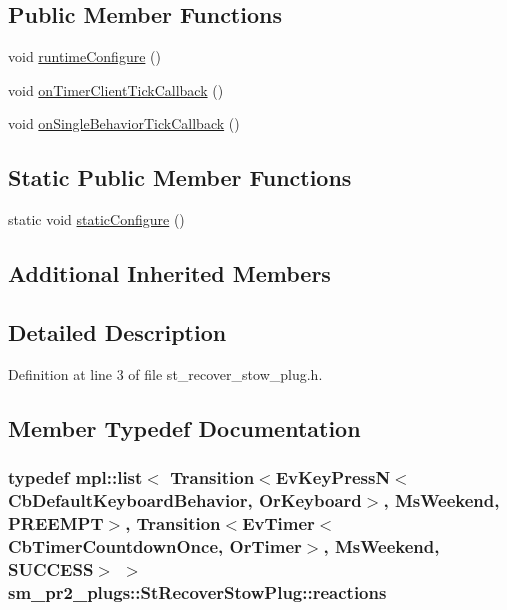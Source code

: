 \subsection*{Public Member Functions}
\begin{DoxyCompactItemize}
\item 
void \hyperlink{structsm__pr2__plugs_1_1StRecoverStowPlug_a5f2f825961ceda59ed4811aaca86bbcf}{runtime\+Configure} ()
\item 
void \hyperlink{structsm__pr2__plugs_1_1StRecoverStowPlug_adda940da8f2073a8bcf5ce4d06baccf2}{on\+Timer\+Client\+Tick\+Callback} ()
\item 
void \hyperlink{structsm__pr2__plugs_1_1StRecoverStowPlug_af118f0e9ead8955ef7152fb8f55474ab}{on\+Single\+Behavior\+Tick\+Callback} ()
\end{DoxyCompactItemize}
\subsection*{Static Public Member Functions}
\begin{DoxyCompactItemize}
\item 
static void \hyperlink{structsm__pr2__plugs_1_1StRecoverStowPlug_a8ac2f706967a6f32561d26dfa894ce04}{static\+Configure} ()
\end{DoxyCompactItemize}
\subsection*{Additional Inherited Members}


\subsection{Detailed Description}


Definition at line 3 of file st\+\_\+recover\+\_\+stow\+\_\+plug.\+h.



\subsection{Member Typedef Documentation}
\subsubsection[{\texorpdfstring{reactions}{reactions}}]{\setlength{\rightskip}{0pt plus 5cm}typedef mpl\+::list$<$ Transition$<$Ev\+Key\+PressN$<$Cb\+Default\+Keyboard\+Behavior, {\bf Or\+Keyboard}$>$, {\bf Ms\+Weekend}, {\bf P\+R\+E\+E\+M\+PT}$>$, Transition$<$Ev\+Timer$<$Cb\+Timer\+Countdown\+Once, {\bf Or\+Timer}$>$, {\bf Ms\+Weekend}, {\bf S\+U\+C\+C\+E\+SS}$>$ $>$ {\bf sm\+\_\+pr2\+\_\+plugs\+::\+St\+Recover\+Stow\+Plug\+::reactions}}\hypertarget{structsm__pr2__plugs_1_1StRecoverStowPlug_a26060a2f965fc75de855e40cefdcac7b}{}\label{structsm__pr2__plugs_1_1StRecoverStowPlug_a26060a2f965fc75de855e40cefdcac7b}


